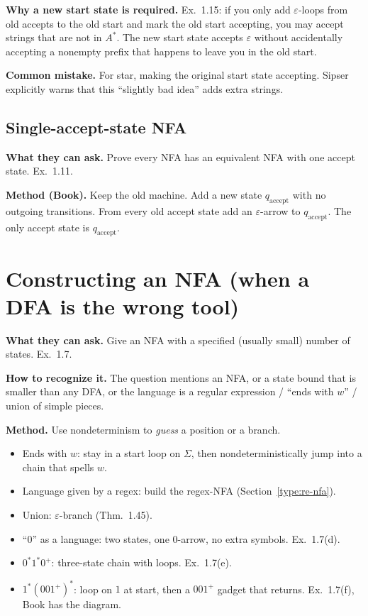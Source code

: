 \documentclass[11pt,a4paper]{article}
\newcommand{\eps}{\varepsilon}
\begin{document}
\textbf{Why a new start state is required.}
Ex.~1.15: if you only add $\eps$-loops from old accepts to the old
start and mark the old start accepting, you may accept strings that
are not in $A^*$. The new start state accepts $\eps$ without
accidentally accepting a nonempty prefix that happens to leave you in
the old start.

\textbf{Common mistake.}
For star, making the original start state accepting. Sipser explicitly
warns that this ``slightly bad idea'' adds extra strings.

\subsection{Single-accept-state NFA}

\textbf{What they can ask.}
Prove every NFA has an equivalent NFA with one accept state.
Ex.~1.11.

\textbf{Method (Book).}
Keep the old machine. Add a new state $q_{\mathrm{accept}}$ with no
outgoing transitions. From every old accept state add an $\eps$-arrow
to $q_{\mathrm{accept}}$. The only accept state is
$q_{\mathrm{accept}}$.

\section{Constructing an NFA (when a DFA is the wrong tool)}
\label{type:nfa-design}

\textbf{What they can ask.}
Give an NFA with a specified (usually small) number of states.
Ex.~1.7.

\textbf{How to recognize it.}
The question mentions an NFA, or a state bound that is smaller than
any DFA, or the language is a regular expression / ``ends with $w$'' /
union of simple pieces.

\textbf{Method.}
Use nondeterminism to \emph{guess} a position or a branch.
\begin{itemize}[nosep]
  \item Ends with $w$: stay in a start loop on $\Sigma$, then
        nondeterministically jump into a chain that spells $w$.
  \item Language given by a regex: build the regex-NFA
        (Section~\ref{type:re-nfa}).
  \item Union: $\eps$-branch (Thm.~1.45).
  \item ``$0$'' as a language: two states, one $0$-arrow, no extra
        symbols. Ex.~1.7(d).
  \item $0^*1^*0^+$: three-state chain with loops. Ex.~1.7(e).
  \item $1^*(001^+)^*$: loop on $1$ at start, then a $001^+$ gadget
        that returns. Ex.~1.7(f), Book has the diagram.
\end{itemize}
\end{document}
